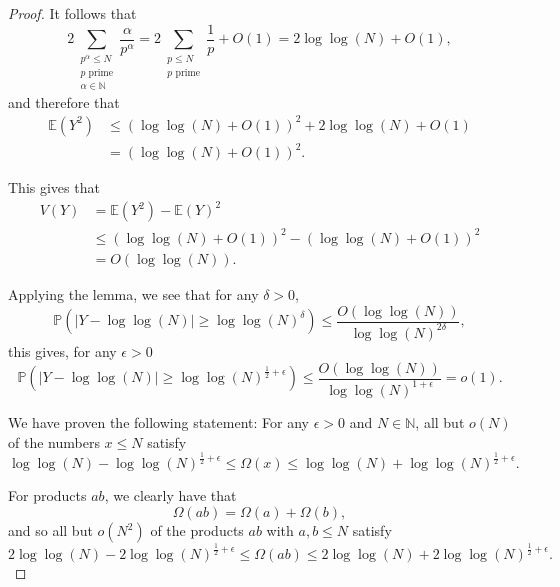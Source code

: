 \documentclass[12pt,reqno]{amsart}
\begin{document}
\begin{proof}
It follows that
\[
    2 \sum _{\substack{ p ^{\alpha} \leq N \\ p \text{ prime} \\ \alpha \in  \mathbb{N} }} \frac{\alpha}{p ^{\alpha}} = 2 \sum _{\substack{ p \leq N \\ p  \text{ prime} }} \frac{1}{p}  + O(1) = 2 \log\log \left( N \right) + O(1)
,\]
and therefore that
\begin{align*}
\mathbb{E} \left( Y^{2} \right) & \leq \left( \log\log \left( N \right) + O(1) \right)^{2} + 2 \log\log \left( N \right) + O(1)\\
& = \left( \log\log \left( N \right)  + O(1) \right) ^{2}. 
\end{align*}


This gives that
\begin{align*}
V(Y) & = \mathbb{E} \left( Y^{2} \right) - \mathbb{E} (Y)^{2}\\
& \leq \left( \log\log \left( N \right) + O(1) \right) ^{2} - \left( \log\log \left( N \right) + O(1) \right) ^{2}\\
& = O \left( \log\log \left( N \right)  \right).
\end{align*}

Applying the lemma, we see that for any \(\delta > 0\),
\[
    \mathbb{P} \left( \left\lvert Y - \log\log \left( N \right)  \right\rvert \geq \log\log \left( N \right) ^{\delta} \right) \leq \frac{O(\log\log \left( N \right) )}{\log\log \left( N \right) ^{2\delta}} 
,\]
this gives, for any \(\epsilon > 0\)
\[
    \mathbb{P} \left( \left\lvert Y - \log\log \left( N \right)  \right\rvert \geq \log\log \left( N \right) ^{\frac{1}{2} + \epsilon} \right) \leq \frac{O(\log\log \left( N \right) )}{\log\log \left( N \right) ^{1 + \epsilon}} = o(1) 
.\]

We have proven the following statement: For any \(\epsilon > 0\) and \(N \in \mathbb{N} \), all but \(o(N)\) of the
numbers \(x \leq N\) satisfy
\[
    \log\log \left( N \right) - \log\log \left( N \right) ^{\frac{1}{2} + \epsilon} \leq \Omega(x) \leq \log\log \left( N \right) + \log\log \left( N \right) ^{\frac{1}{2} + \epsilon} 
.\]

For products \(ab\), we clearly have that
\[
    \Omega(ab) = \Omega(a) + \Omega(b)
,\]
and so all but \(o(N^{2})\) of the products \(ab\) with \(a,b \leq N\) satisfy
\[
    2\log\log \left( N \right) - 2\log\log \left( N \right) ^{\frac{1}{2} + \epsilon} \leq \Omega(ab) \leq 2\log\log \left( N \right) + 2\log\log \left( N \right) ^{\frac{1}{2} + \epsilon} 
.\]


\end{proof}
\end{document}
